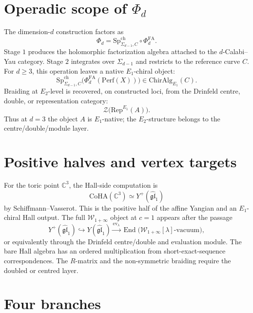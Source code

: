 \documentclass[10pt]{article}
\providecommand{\CoHA}{\mathrm{CoHA}}
\providecommand{\Perf}{\mathrm{Perf}}
\providecommand{\SpCh}{\mathrm{Sp}^{\mathrm{ch}}}
\providecommand{\PhiFA}{\Phi^{\mathrm{FA}}}
\providecommand{\Eone}{E_1}
\providecommand{\Etwo}{E_2}
\providecommand{\cW}{\mathcal{W}}
\begin{document}
\section*{Operadic scope of \(\Phi_d\)}

The dimension-\(d\) construction factors as
\[
        \Phi_d=\SpCh_{\Sigma_{d-1},C}\circ\PhiFA_d.
\]
Stage \(1\) produces the holomorphic factorization algebra attached to
the \(d\)-Calabi--Yau category.  Stage \(2\) integrates over
\(\Sigma_{d-1}\) and restricts to the reference curve \(C\).  For
\(d\geq3\), this operation leaves a native \(\Eone\)-chiral object:
\[
        \SpCh_{\Sigma_{d-1},C}
        \bigl(\PhiFA_d(\Perf(X))\bigr)\in
        \mathrm{ChirAlg}_{\Eone}(C).
\]
Braiding at \(\Etwo\)-level is recovered, on constructed loci, from
the Drinfeld centre, double, or representation category:
\[
        \mathcal Z\bigl(\mathrm{Rep}^{\Eone}(A)\bigr).
\]
Thus at \(d=3\) the object \(A\) is \(\Eone\)-native; the
\(\Etwo\)-structure belongs to the centre/double/module layer.

\section*{Positive halves and vertex targets}

For the toric point \(\mathbb C^3\), the Hall-side computation is
\[
        \CoHA(\mathbb C^3)\simeq Y^+(\widehat{\mathfrak{gl}}_1)
\]
by Schiffmann--Vasserot.  This is the positive half of the affine
Yangian and an \(\Eone\)-chiral Hall output.  The full
\(\cW_{1+\infty}\) object at \(c=1\) appears after the passage
\[
        Y^+(\widehat{\mathfrak{gl}}_1)
        \hookrightarrow
        Y(\widehat{\mathfrak{gl}}_1)
        \xrightarrow{\mathrm{ev}_\lambda}
        \operatorname{End}\bigl(\cW_{1+\infty}[\lambda]\text{-vacuum}\bigr),
\]
or equivalently through the Drinfeld centre/double and evaluation
module.  The bare Hall algebra has an ordered multiplication from
short-exact-sequence correspondences.  The \(R\)-matrix and the
non-symmetric braiding require the doubled or centred layer.

\section*{Four branches}
\end{document}
